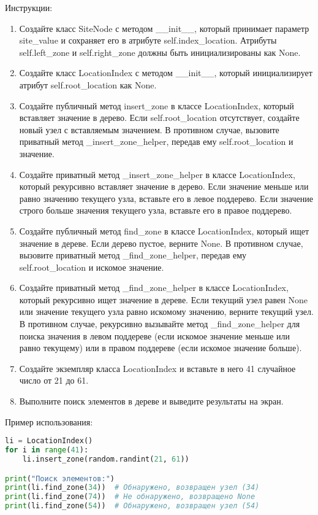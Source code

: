 \begin{enumerate}
Инструкции:
\begin{enumerate}
    \item Создайте класс SiteNode с методом \_\_init\_\_, который принимает параметр site\_value и сохраняет его в атрибуте self.index\_location. Атрибуты self.left\_zone и self.right\_zone должны быть инициализированы как None.
    \item Создайте класс LocationIndex с методом \_\_init\_\_, который инициализирует атрибут self.root\_location как None.
    \item Создайте публичный метод insert\_zone в классе LocationIndex, который вставляет значение в дерево. Если self.root\_location отсутствует, создайте новый узел с вставляемым значением. В противном случае, вызовите приватный метод \_insert\_zone\_helper, передав ему self.root\_location и значение.
    \item Создайте приватный метод \_insert\_zone\_helper в классе LocationIndex, который рекурсивно вставляет значение в дерево. Если значение меньше или равно значению текущего узла, вставьте его в левое поддерево. Если значение строго больше значения текущего узла, вставьте его в правое поддерево.
    \item Создайте публичный метод find\_zone в классе LocationIndex, который ищет значение в дереве. Если дерево пустое, верните None. В противном случае, вызовите приватный метод \_find\_zone\_helper, передав ему self.root\_location и искомое значение.
    \item Создайте приватный метод \_find\_zone\_helper в классе LocationIndex, который рекурсивно ищет значение в дереве. Если текущий узел равен None или значение текущего узла равно искомому значению, верните текущий узел. В противном случае, рекурсивно вызывайте метод \_find\_zone\_helper для поиска значения в левом поддереве (если искомое значение меньше или равно текущему) или в правом поддереве (если искомое значение больше).
    \item Создайте экземпляр класса LocationIndex и вставьте в него 41 случайное число от 21 до 61.
    \item Выполните поиск элементов в дереве и выведите результаты на экран.
\end{enumerate}

Пример использования:
\begin{lstlisting}[language=Python]
li = LocationIndex()
for i in range(41):
    li.insert_zone(random.randint(21, 61))

print("Поиск элементов:")
print(li.find_zone(34))  # Обнаружено, возвращен узел (34)
print(li.find_zone(74))  # Не обнаружено, возвращено None
print(li.find_zone(54))  # Обнаружено, возвращен узел (54)
\end{lstlisting}


\end{enumerate}
